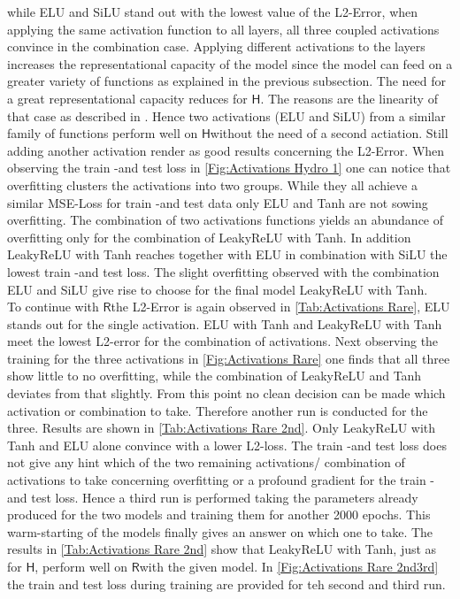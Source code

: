 \documentclass[12pt, a4paper]{article}
\newcommand{\hy}{\(\textsf{H}\)}
\newcommand{\rare}{\(\textsf{R}\)}
\begin{document}
while ELU and SiLU stand out with the lowest value of the L2-Error, when applying the same activation function to all layers, all three coupled activations convince in the combination case. Applying different activations to the layers increases the representational capacity of the model since the model can feed on a greater variety of functions as explained in the previous subsection. The need for a great representational capacity reduces for \hy. The reasons are the linearity of that case as described in \cite{BGK}. Hence two activations (ELU and SiLU) from a similar family of functions perform well on \hy without the need of a second actiation. Still adding another activation render as good results concerning the L2-Error. When observing the train -and test loss in \cref{Fig:Activations Hydro 1} one can notice that overfitting clusters the activations into two groups. While they all achieve a similar MSE-Loss for train -and test data only ELU and Tanh are not sowing overfitting. The combination of two activations functions yields an abundance of overfitting only for the combination of LeakyReLU with Tanh. In addition LeakyReLU with Tanh reaches together with ELU in combination with SiLU the lowest train -and test loss. The slight overfitting observed with the combination ELU and SiLU  give rise to choose for the final model LeakyReLU with Tanh.\\
To continue with \rare  the L2-Error is again observed in \cref{Tab:Activations Rare}, ELU stands out for the single activation. ELU with Tanh and LeakyReLU with Tanh meet the lowest L2-error for the combination of activations. Next observing the training for the three activations in \cref{Fig:Activations Rare} one finds that all three show little to no overfitting, while the combination of LeakyReLU and Tanh deviates from that slightly. From this point no clean decision can be made which activation or combination to take. Therefore another run is conducted for the three. Results are shown in \cref{Tab:Activations Rare 2nd}. Only LeakyReLU with Tanh and ELU alone convince with a lower L2-loss. The train -and test loss does not give any hint which of the two remaining activations/ combination of activations to take concerning overfitting or a profound gradient for the train -and test loss. Hence a third run is performed taking the parameters already produced for the two models and training them for another 2000 epochs. This warm-starting of the models finally gives an answer on which one to take. The results in \cref{Tab:Activations Rare 2nd} show that LeakyReLU with Tanh, just as for \hy, perform well on \rare with the given model. In \cref{Fig:Activations Rare 2nd3rd} the train and test loss during training are provided for teh second and third run. 
\end{document}
